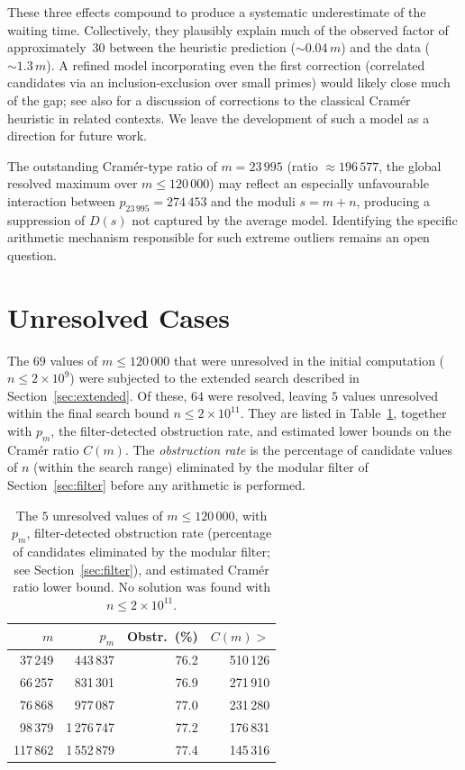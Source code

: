 \documentclass[pdflatex,sn-mathphys-num,Numbered]{sn-jnl}
\theoremstyle{thmstyleone}
\theoremstyle{thmstylethree}
\theoremstyle{thmstyletwo}
\numberwithin{equation}{section}
\begin{document}
These three effects compound to produce a systematic underestimate
of the waiting time.
Collectively, they plausibly explain much of the observed factor of
approximately~$30$ between the heuristic prediction
($\sim 0.04\,m$) and the data ($\sim 1.3\,m$).
A refined model incorporating even the first correction (correlated
candidates via an inclusion-exclusion over small primes) would
likely close much of the gap; see also \cite{Granville1995} for a
discussion of corrections to the classical Cram\'er heuristic
in related contexts.
We leave the development of such a model as a direction for
future work.

The outstanding Cram\'er-type ratio of $m = 23\,995$
(ratio $\approx 196\,577$, the global resolved maximum over
$m \leq 120\,000$) may reflect an especially unfavourable interaction
between $p_{23\,995} = 274\,453$ and the moduli $s = m+n$, producing
a suppression of $D(s)$ not captured by the average model.
Identifying the specific arithmetic mechanism responsible for such
extreme outliers remains an open question.

\section{Unresolved Cases}
\label{sec:notfound}

The $69$ values of $m \leq 120\,000$ that were unresolved in the
initial computation ($n \leq 2 \times 10^9$) were subjected to the
extended search described in Section~\ref{sec:extended}.
Of these, $64$ were resolved, leaving $5$ values unresolved
within the final search bound $n \leq 2 \times 10^{11}$.
They are listed in Table~\ref{tab:notfound}, together with $p_m$,
the filter-detected obstruction rate, and estimated lower bounds on
the Cram\'er ratio $C(m)$.
The \emph{obstruction rate} is the percentage of candidate values of $n$
(within the search range) eliminated by the modular filter of
Section~\ref{sec:filter} before any arithmetic is performed.

\begin{table}[ht]
\centering
\caption{The $5$ unresolved values of $m \leq 120\,000$, with $p_m$,
	filter-detected obstruction rate (percentage of candidates
	eliminated by the modular filter; see Section~\ref{sec:filter}),
	and estimated Cram\'er ratio lower bound.
	No solution was found with $n \leq 2 \times 10^{11}$.}
\label{tab:notfound}
\small
\begin{tabular}{rrrr}
	\toprule
	$m$ & $p_m$ & Obstr.\ (\%) & $C(m) >$ \\
	\midrule
	37\,249  &   443\,837 & 76.2 & 510\,126 \\
	66\,257  &   831\,301 & 76.9 & 271\,910 \\
	76\,868  &   977\,087 & 77.0 & 231\,280 \\
	98\,379  & 1\,276\,747 & 77.2 & 176\,831 \\
	117\,862 & 1\,552\,879 & 77.4 & 145\,316 \\
	\bottomrule
\end{tabular}
\end{table}
\end{document}
